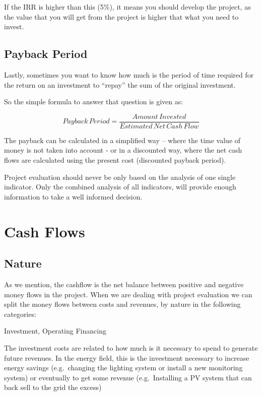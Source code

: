 \documentclass[]{book}
\theoremstyle{definition}
\theoremstyle{definition}
\theoremstyle{definition}
\theoremstyle{remark}
\begin{document}
If the IRR is higher than this (5\%), it means you should develop the
project, as the value that you will get from the project is higher that
what you need to invest.

\subsection{Payback Period}\label{payback-period}

Lastly, sometimes you want to know how much is the period of time
required for the return on an investment to ``repay'' the sum of the
original investment.

So the simple formula to answer that question is given as:

\[Payback \, Period = \frac{Amount\,Invested}{Estimated\,Net\,Cash\,Flow}\]

The payback can be calculated in a simplified way -- where the time
value of money is not taken into account - or in a discounted way, where
the net cash flows are calculated using the present cost (discounted
payback period).

Project evaluation should never be only based on the analysis of one
single indicator. Only the combined analysis of all indicators, will
provide enough information to take a well informed decision.

\section{Cash Flows}\label{cash-flows}

\subsection{Nature}\label{nature}

As we mention, the cashflow is the net balance between positive and
negative money flows in the project. When we are dealing with project
evaluation we can split the money flows between costs and revenues, by
nature in the following categories:

Investment, Operating Financing

The investment costs are related to how much is it necessary to spend to
generate future revenues. In the energy field, this is the investment
necessary to increase energy savings (e.g.~changing the lighting system
or install a new monitoring system) or eventually to get some revenue
(e.g.~Installing a PV system that can back sell to the grid the excess)
\end{document}

